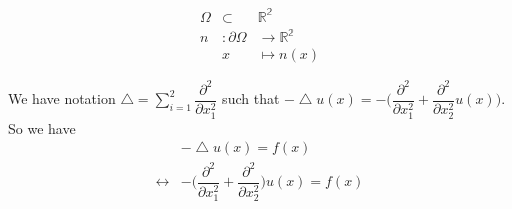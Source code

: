 \documentclass[a4paper,10pt]{article}
\begin{document}
\begin{eqnarray}\nonumber
\Omega &\subset &\mathbb{R^2} \\ \nonumber
n &: \partial \Omega &\rightarrow \mathbb{R^2} \\ \nonumber
&x &\mapsto n(x)
\end{eqnarray}

We have notation $ \bigtriangleup = \sum_{i=1}^{2} \dfrac{\partial^2}{\partial x_{1}^{2}} $ such that $ -\bigtriangleup u(x) = -\big( \dfrac{\partial^{2}}{\partial x_{1}^{2}} + \dfrac{\partial^{2}}{\partial x_{2}^{2}} u(x) \big) $. So we have
\begin{eqnarray}\nonumber
& -\bigtriangleup u(x) = f(x) \\ \nonumber
\leftrightarrow &  - \big( \dfrac{\partial^{2}}{\partial x_{1}^{2}} + \dfrac{\partial^{2}}{\partial x_{2}^{2}} \big) u(x) = f(x)
\end{eqnarray}
\end{document}
